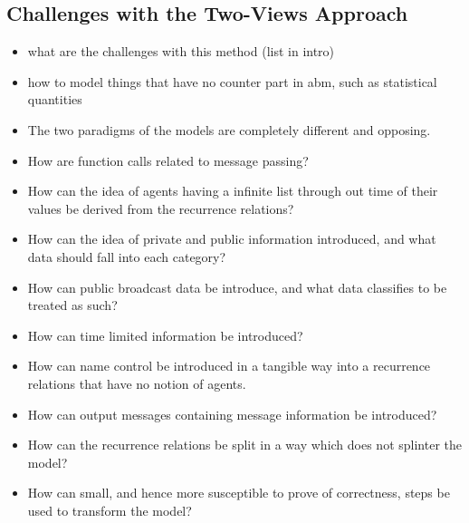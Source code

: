 \documentclass{article}
\begin{document}
\subsection{Challenges with the Two-Views Approach} \label{twoviewsapproach} 
\begin{itemize}
  \item what are the challenges with this method (list in intro) 
\end{itemize}


\begin{itemize}
   \item how to model things that have no counter part in abm, such as statistical quantities 
   \item The two paradigms of the models are completely different and opposing. 
   \item How are function calls related to message passing?
   \item How can the idea of agents having a infinite list through out time of their values be derived from the recurrence relations? 
   \item How can the idea of private and public information introduced, and what data should fall into each category? 
   \item How can public broadcast data be introduce, and what data classifies to be treated as such? 
   \item How can time limited information be introduced?
   \item How can name control be introduced in a tangible way into a recurrence relations that have no notion of agents. 
   \item How can output messages containing message information be introduced? 
   \item How can the recurrence relations be split in a way which does not splinter the model? 
   \item How can small, and hence more susceptible to prove of correctness, steps be used to transform the model? 
\end{itemize}
\end{document}
